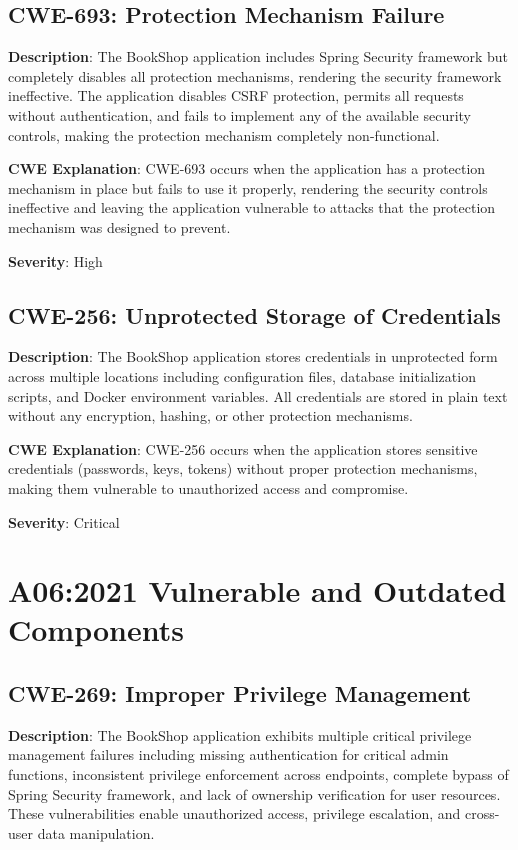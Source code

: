 \documentclass[]{UCD_CS_FYP_Report}
\begin{document}
\section{CWE-693: Protection Mechanism Failure}

\textbf{Description}: The BookShop application includes Spring Security framework but completely disables all protection mechanisms, rendering the security framework ineffective. The application disables CSRF protection, permits all requests without authentication, and fails to implement any of the available security controls, making the protection mechanism completely non-functional.

\textbf{CWE Explanation}: CWE-693 occurs when the application has a protection mechanism in place but fails to use it properly, rendering the security controls ineffective and leaving the application vulnerable to attacks that the protection mechanism was designed to prevent.

\textbf{Severity}: High



\section{CWE-256: Unprotected Storage of Credentials}

\textbf{Description}: The BookShop application stores credentials in unprotected form across multiple locations including configuration files, database initialization scripts, and Docker environment variables. All credentials are stored in plain text without any encryption, hashing, or other protection mechanisms.

\textbf{CWE Explanation}: CWE-256 occurs when the application stores sensitive credentials (passwords, keys, tokens) without proper protection mechanisms, making them vulnerable to unauthorized access and compromise.

\textbf{Severity}: Critical



\chapter{A06:2021 Vulnerable and Outdated Components}

\section{CWE-269: Improper Privilege Management}

\textbf{Description}: The BookShop application exhibits multiple critical privilege management failures including missing authentication for critical admin functions, inconsistent privilege enforcement across endpoints, complete bypass of Spring Security framework, and lack of ownership verification for user resources. These vulnerabilities enable unauthorized access, privilege escalation, and cross-user data manipulation.
\end{document}
